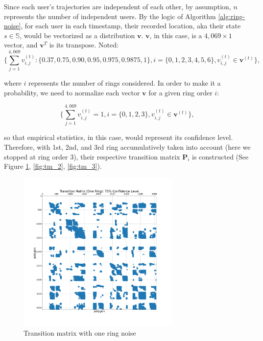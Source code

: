 \documentclass[12pt]{article}
\theoremstyle{definition}
\begin{document}
Since each user’s trajectories are independent of each other, by assumption, \(n\) represents the number of independent users. By the logic of Algorithm \ref{alg:ring-noise}, for each user in each timestamp, their recorded location, aka their state \(s \in \mathbb{S}\), would be vectorized as a distribution \(\boldsymbol{v}\). \(\boldsymbol{v}\), in this case, is a \(4,069 \times 1\) vector, and \(\boldsymbol{v}^{T}\) is its transpose. Noted:
\begin{equation*}
    \{\sum_{j=1}^{4,069} v_{i,j}^{(t)}:\{0.37,0.75,0.90,0.95,0.975,0.9875,1\},
    i=\{0,1,2,3,4,5,6\},v_{i,j}^{(t)} \in \boldsymbol{v}^{(t)} \},
\end{equation*}

where \(i\) represents the number of rings considered. In order to make it a probability, we need to normalize each vector \(\boldsymbol{v}\) for a given ring order \(i\):

\begin{equation*}
    \{\sum_{j=1}^{4,069} v_{i,j}^{(t)}=1, i=\{0,1,2,3\}, v_{i,j}^{(t)} \in \boldsymbol{v}^{(t)} \},
\end{equation*}

so that empirical statistics, in this case, would represent its confidence level. Therefore, with 1st, 2nd, and 3rd ring accumulatively taken into account (here we stopped at ring order 3), their respective transition matrix \(\textbf{P}_i\) is constructed (See Figure \ref{fig:tm_1}, \ref{fig:tm_2}, \ref{fig:tm_3}).

\newpage

\begin{figure}
  \centering
  \includegraphics[width=8cm]{TM_1.png}
  \caption{Transition matrix with one ring noise}
  \label{fig:tm_1}
\end{figure}
\end{document}

